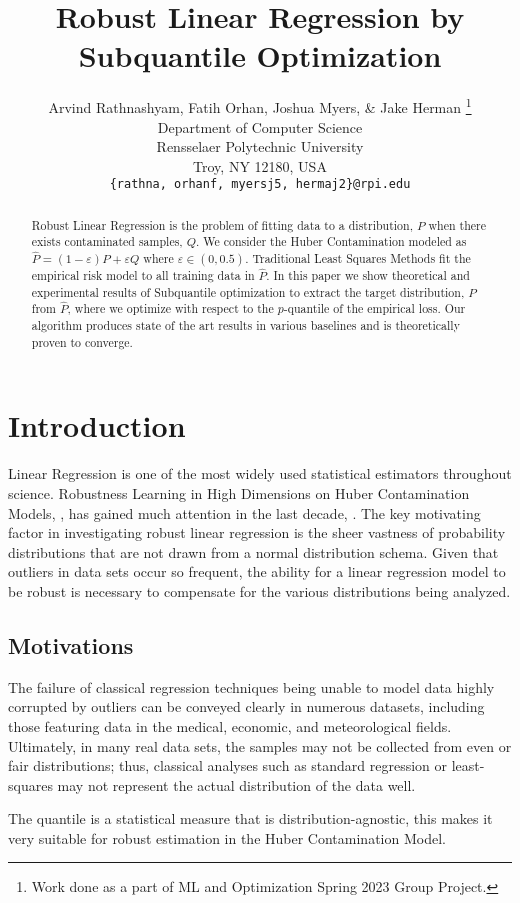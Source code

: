 \documentclass{article} %
\title{Robust Linear Regression by Subquantile Optimization}
\author{Arvind Rathnashyam, Fatih Orhan, Joshua Myers, \& Jake Herman  \thanks{ Work done as a part of ML and Optimization Spring 2023 Group Project.} \\
	Department of Computer Science\\
	Rensselaer Polytechnic University\\
	Troy, NY 12180, USA \\
	\texttt{\{rathna, orhanf, myersj5, hermaj2\}@rpi.edu} \\
}
\begin{document}
	
	\maketitle
	
	\begin{abstract}
		Robust Linear Regression is the problem of fitting data to a distribution, $P$ when there exists contaminated samples, $Q$. We consider the Huber Contamination modeled as $\hat{P} = (1-\varepsilon)P + \varepsilon Q$ where $\varepsilon \in (0,0.5)$. Traditional Least Squares Methods fit the empirical risk model to all training data in $\displaystyle \hat{P}$. In this paper we show theoretical and experimental results of Subquantile optimization to extract the target distribution, $P$ from $\hat{P}$, where we optimize with respect to the $p$-quantile of the empirical loss. Our algorithm produces state of the art results in various baselines and is theoretically proven to converge.  
	\end{abstract}
	
	\section{Introduction}
	
	Linear Regression is one of the most widely used statistical estimators throughout science. Robustness Learning in High Dimensions on Huber Contamination Models, \cite{Huber2009}, has gained much attention in the last decade, \cite{Diakonikolas2019RecentAI}. The key motivating factor in investigating robust linear regression is the sheer vastness of probability distributions that are not drawn from a normal distribution schema. Given that outliers in data sets occur so frequent, the ability for a linear regression model to be robust is necessary to compensate for the various distributions being analyzed. 
	\subsection{Motivations}
	The failure of classical regression techniques being unable to model data highly corrupted by outliers can be conveyed clearly in numerous datasets, including those featuring data in the medical, economic, and meteorological fields. Ultimately, in many real data sets, the samples may not be collected from even or fair distributions; thus, classical analyses such as standard regression or least-squares may not represent the actual distribution of the data well. 
	
	The quantile is a statistical measure that is distribution-agnostic, this makes it very suitable for robust estimation in the Huber Contamination Model. 
	
\end{document}
